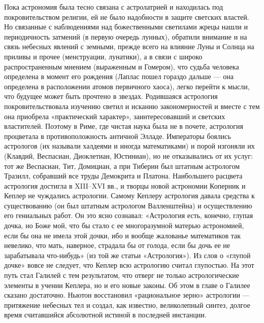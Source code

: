 Пока астрономия была тесно связана с астролатрией и находилась под
покровительством религии, ей не было надобности в защите светских властей. Но
связанные с наблюдениями над божественными светилами жрецы нашли и
периодичность затмений (в первую очередь лунных), обратили внимание и на связь
небесных явлений с земными, прежде всего на влияние Луны и Солнца на приливы и
прочее (менструации, лунатики), а в связи с широко распространенным мнением
(выраженным и Гомером), что судьба человека определена в момент его рождения
(Лаплас пошел гораздо дальше --- она определена в расположении атомов
первичного хаоса), легко перейти к мысли, что будущее может быть прочтено в
звездах. Родившаяся астрология покровительствовала изучению светил и исканию
закономерностей и вместе с тем она приобрела «практический характер»,
заинтересовавший и светских властителей. Поэтому в Риме, где чистая наука была
не в почете, астрология процветала в противоположность античной Элладе.
Императоры боялись астрологов (их называли халдеями и иногда математиками) и
порой изгоняли их (Клавдий, Веспасиан, Диоклетиан, Юстиниан), но не
отказывались от их услуг: тот же Веспасиан, Тит, Домициан, а при Тиберии был
штатным астрологом Тразилл, собравший все труды Демокрита и Платона.
Наибольшего расцвета астрология достигла в XIII--XVI вв., и творцы новой
астрономии Коперник и Кеплер не чуждались астрологии. Самому Кеплеру астрология
давала средства к существованию (он был штатным астрологом Валленштейна) и
осуществлению его гениальных работ. Он это ясно сознавал: «Астрология есть,
конечно, глупая дочка, но Боже мой, что бы стало с ее многоразумной матерью
астрономией, если бы она не имела этой дочки, ибо и вообще жалованье
математиков так невелико, что мать, наверное, страдала бы от голода, если бы
дочь ее не зарабатывала что-нибудь» (из той же статьи «Астрология»). Из слов о
«глупой дочке» вовсе не следует, что Кеплер всю астрологию считал глупостью. На
этот путь стал Галилей с тем результатом, что отверг не только астрологические
элементы в учении Кеплера, но и его новые законы. Об этом в главе о Галилее
сказано достаточно. Ньютон восстановил «рациональное зерно» астрологии ---
притяжение небесных тел и создал, как известно, великолепный синтез, долгое
время считавшийся абсолютной истиной в последней инстанции.


